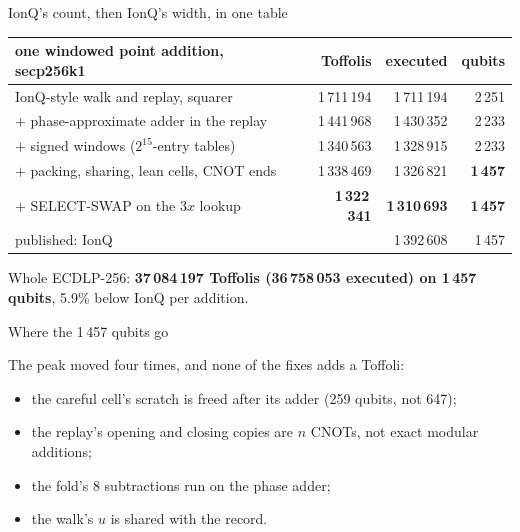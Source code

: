 \documentclass[aspectratio=169,11pt]{beamer}
\begin{document}
\setcounter{framenumber}{179}
\begin{frame}{IonQ's count, then IonQ's width, in one table}
  \centering\small
  \renewcommand{\arraystretch}{1.15}
  \begin{tabular}{@{}lrrr@{}}
    \toprule
    one windowed point addition, secp256k1 & Toffolis & executed & qubits \\
    \midrule
    IonQ-style walk and replay, squarer & 1\,711\,194 & 1\,711\,194 & 2\,251 \\
    $+$ phase-approximate adder in the replay & 1\,441\,968 & 1\,430\,352 & 2\,233 \\
    $+$ signed windows ($2^{15}$-entry tables) & 1\,340\,563 & 1\,328\,915 & 2\,233 \\
    $+$ packing, sharing, lean cells, CNOT ends & 1\,338\,469 & 1\,326\,821 & \textbf{1\,457} \\
    $+$ SELECT-SWAP on the $3x$ lookup & \textbf{1\,322\,341} & \textbf{1\,310\,693} & \textbf{1\,457} \\
    \midrule
    published: IonQ & & 1\,392\,608 & 1\,457 \\
    \bottomrule
  \end{tabular}
  \begin{takeaway}Whole ECDLP-256: \textbf{37\,084\,197 Toffolis (36\,758\,053 executed) on 1\,457 qubits}, 5.9\% below IonQ per addition.\end{takeaway}
\end{frame}

\setcounter{framenumber}{180}
\begin{frame}{Where the 1\,457 qubits go}
  \centering
  \vskip3mm
  \raggedright
  The peak moved four times, and none of the fixes adds a Toffoli:
  \begin{itemize}
    \item the careful cell's scratch is freed after its adder (259 qubits, not 647);
    \item the replay's opening and closing copies are $n$ CNOTs, not exact modular additions;
    \item the fold's 8 subtractions run on the phase adder;
    \item the walk's $u$ is shared with the record.
  \end{itemize}
\end{frame}
\end{document}
